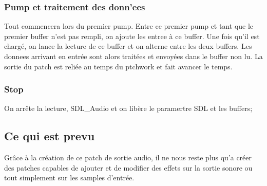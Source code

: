 \subsubsection{Pump et traitement des donn'ees}
\par
Tout commencera lors du premier pump. Entre ce premier pump et tant que 
le premier buffer n'est pas rempli, on ajoute les entree \`a ce buffer. 
Une fois qu'il est charg\'e, on lance la lecture de ce buffer et on alterne 
entre les deux buffers. Les donnees arrivant en entr\'ee sont alors trait\'ees 
et envoy\'ees dans le buffer non lu. La sortie du patch est reli\'ee au temps du 
ptchwork et fait avancer le temps.
\subsubsection{Stop}
\par
On arr\^ete la lecture, SDL\_Audio et on lib\`ere le paramertre SDL et les buffers;

\subsection{Ce qui est prevu}
\par
Gr\^ace \`a la cr\'eation de ce patch de sortie audio, il ne nous reste plus qu'a 
cr\'eer des patches capables de ajouter et de modifier des effets sur la sortie 
sonore ou tout simplement sur les samples d'entr\'ee. 